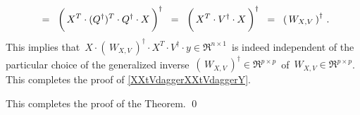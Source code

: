 \begin{enumerate}
\begin{equation*}
	\;\; = \;\;
	\left(\,X^{T} \cdot (Q^{\dagger})^{T} \overset{{\color{white}\vert}}{\cdot} Q^{\dagger} \cdot X\,\right)^{\dagger}
	\;\; = \;\;
	\left(\,X^{T} \overset{{\color{white}\vert}}{\cdot} V^{\dagger} \cdot X\,\right)^{\dagger}
	\;\; = \;\;
	\left(\,W_{X,V}\,\right)^{\dagger}\,.
	\end{equation*}
	This implies that
	\,$X \cdot \left(\,W_{X,V}\,\right)^{\dagger} \cdot X^{T} \cdot V^{\dagger} \cdot y \in \Re^{n \times 1}$\,
	is indeed independent of the particular choice of the generalized inverse
	\,$\left(\,W_{X,V}\,\right)^{\dagger} \in \Re^{p \times p}$\,
	of \,$W_{X,V} \in \Re^{p \times p}$.\,
	This completes the proof of \eqref{XXtVdaggerXXtVdaggerY}.

\end{enumerate}
This completes the proof of the Theorem.
\qed


